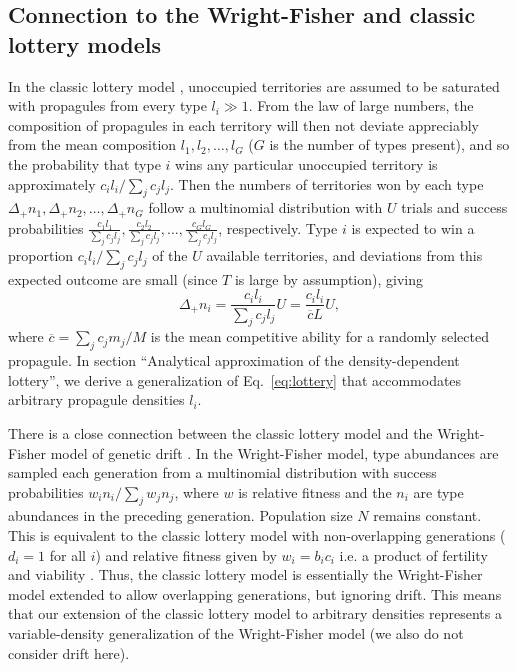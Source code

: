 \documentclass[12pt]{article}
\begin{document}
\subsection*{Connection to the Wright-Fisher and classic lottery models}

In the classic lottery model \citep{chesson_1981}, unoccupied territories are assumed to be saturated with propagules from every type $l_i\gg 1$. From the law of large numbers, the composition of propagules in each territory will then not deviate appreciably from the mean composition $l_1,l_2,\ldots,l_G$ ($G$ is the number of types present), and so the probability that type $i$ wins any particular unoccupied territory is approximately $c_i l_i/\sum_j c_j l_j$. Then the numbers of territories won by each type $\Delta_+ n_1,\Delta_+ n_2,\ldots,\Delta_+ n_G$ follow a multinomial distribution with $U$ trials and success probabilities $\frac{c_1 l_1}{\sum_j c_j l_j},\frac{c_2 l_2}{\sum_j c_j l_j},\ldots,\frac{c_G l_G}{\sum_j c_j l_j}$, respectively. Type $i$ is expected to win a proportion $c_i l_i/\sum_j c_j l_j$ of the $U$ available territories, and deviations from this expected outcome are small (since $T$ is large by assumption), giving 
\begin{equation}
\Delta_+ n_i=\frac{c_i l_i}{\sum_j c_j l_j}U=\frac{c_i l_i}{\overline{c}L}U, \label{eq:lottery}
\end{equation}
where $\overline{c}=\sum_j c_j m_j/M$ is the mean competitive ability for a randomly selected propagule. In section ``Analytical approximation of the density-dependent lottery'', we derive a generalization of Eq.~\eqref{eq:lottery} that accommodates arbitrary propagule densities $l_i$.
 
There is a close connection between the classic lottery model and the Wright-Fisher model of genetic drift \citep{svardal_2015}. In the Wright-Fisher model, type abundances are sampled each generation from a multinomial distribution with success probabilities $w_i n_i/\sum_j w_j n_j$, where $w$ is relative fitness and the $n_i$ are  type abundances in the preceding generation. Population size $N$ remains constant. This is equivalent to the classic lottery model with non-overlapping generations ($d_i=1$ for all $i$) and relative fitness given by $w_i=b_i c_i$ i.e. a product of fertility and viability \citep[pp. 185]{crow_1970}. Thus, the classic lottery model is essentially the Wright-Fisher model extended to allow overlapping generations, but ignoring drift. This means that our extension of the classic lottery model to arbitrary densities represents a variable-density generalization of the Wright-Fisher model (we also do not consider drift here).
\end{document}
